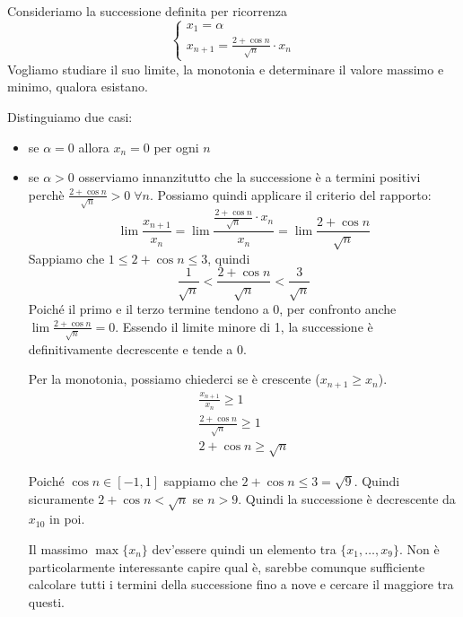 \begin{example}
Consideriamo la successione definita per ricorrenza
\begin{equation*}
\begin{cases}
x_1 = \alpha \\
x_{n+1} = \frac{2 + \cos n}{\sqrt{n}} \cdot x_n
\end{cases}
\end{equation*}
Vogliamo studiare il suo limite, la monotonia e determinare il valore massimo e minimo, qualora esistano.

Distinguiamo due casi:
\begin{itemize}
\item se $\alpha = 0$ allora $x_n = 0$ per ogni $n$
\item se $\alpha > 0$ osserviamo innanzitutto che la successione è a termini positivi perchè $\frac{2+\cos n}{\sqrt{n}} > 0 \; \forall n$. Possiamo quindi applicare il criterio del rapporto:
\begin{equation*}
\lim \frac{x_{n+1}}{x_n} = \lim \frac{\frac{2 + \cos n}{\sqrt{n}} \cdot x_n}{x_n} = \lim \frac{2 + \cos n}{\sqrt{n}}
\end{equation*}
Sappiamo che $1 \le 2 + \cos n \le 3$, quindi
\begin{equation*}
\frac{1}{\sqrt{n}} < \frac{2+\cos n}{\sqrt{n}} < \frac{3}{\sqrt{n}}
\end{equation*}
Poiché il primo e il terzo termine tendono a 0, per confronto anche $\lim \frac{2+\cos n}{\sqrt{n}} = 0$. Essendo il limite minore di 1, la successione è definitivamente decrescente e tende a 0.

Per la monotonia, possiamo chiederci se è crescente ($x_{n+1} \ge x_n$).
\begin{gather*}
\frac{x_{n+1}}{x_n} \ge 1 \\
\frac{2 + \cos n}{\sqrt{n}} \ge 1 \\
2 + \cos n \ge \sqrt{n}
\end{gather*}

Poiché $\cos n \in [-1, 1]$ sappiamo che $2 + \cos n \le 3 = \sqrt{9}$. Quindi sicuramente $2 + \cos n < \sqrt{n}$ se $n > 9$. Quindi la successione è decrescente da $x_10$ in poi.

Il massimo $\max \{x_n\}$ dev'essere quindi un elemento tra $\{x_1, \ldots, x_9\}$. Non è particolarmente interessante capire qual è, sarebbe comunque sufficiente calcolare tutti i termini della successione fino a nove e cercare il maggiore tra questi.
\end{itemize}
\end{example}

